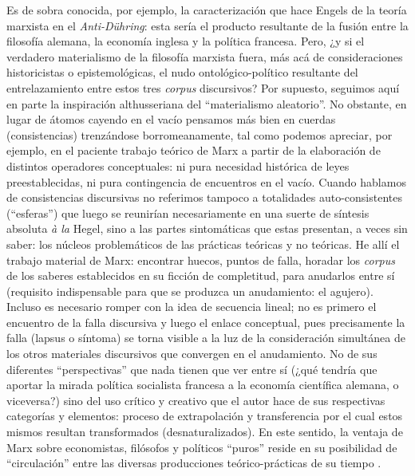 Es de sobra conocida, por ejemplo, la caracterización que hace Engels de la teoría marxista en el \emph{Anti-Dühring}: esta sería el producto resultante de la fusión entre la filosofía alemana, la economía inglesa y la política francesa. Pero, ¿y si el verdadero materialismo de la filosofía marxista fuera, más acá de consideraciones historicistas o epistemológicas, el nudo ontológico-político resultante del entrelazamiento entre estos tres \emph{corpus} discursivos? Por supuesto, seguimos aquí en parte la inspiración althusseriana del \enquote{materialismo aleatorio}. No obstante, en lugar de átomos cayendo en el vacío pensamos más bien en cuerdas (consistencias) trenzándose borromeanamente, tal como podemos apreciar, por ejemplo, en el paciente trabajo teórico de Marx a partir de la elaboración de distintos operadores conceptuales: ni pura necesidad histórica de leyes preestablecidas, ni pura contingencia de encuentros en el vacío. Cuando hablamos de consistencias discursivas no referimos tampoco a totalidades auto-consistentes (\enquote{esferas}) que luego se reunirían necesariamente en una suerte de síntesis absoluta \emph{à la} Hegel, sino a las partes sintomáticas que estas presentan, a veces sin saber: los núcleos problemáticos de las prácticas teóricas y no teóricas. He allí el trabajo material de Marx: encontrar huecos, puntos de falla, horadar los \emph{corpus} de los saberes establecidos en su ficción de completitud, para anudarlos entre sí (requisito indispensable para que se produzca un anudamiento: el agujero). Incluso es necesario romper con la idea de secuencia lineal; no es primero el encuentro de la falla discursiva y luego el enlace conceptual, pues precisamente la falla (lapsus o síntoma) se torna visible a la luz de la consideración simultánea de los otros materiales discursivos que convergen en el anudamiento. No de sus diferentes \enquote{perspectivas} que nada tienen que ver entre sí (¿qué tendría que aportar la mirada política socialista francesa a la economía científica alemana, o viceversa?) sino del uso crítico y creativo que el autor hace de sus respectivas categorías y elementos: proceso de extrapolación y transferencia por el cual estos mismos resultan transformados (desnaturalizados). En este sentido, la ventaja de Marx sobre economistas, filósofos y políticos \enquote{puros} reside en su posibilidad de \enquote{circulación}  entre las diversas producciones teórico-prácticas de su tiempo .

